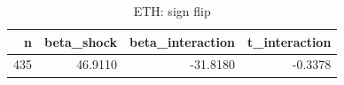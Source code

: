 \begin{table}
\caption{ETH: sign flip}
\label{tab:t7_sign_flip_ETH}
\begin{tabular}{rrrr}
\toprule
n & beta\_shock & beta\_interaction & t\_interaction \\
\midrule
435 & 46.9110 & -31.8180 & -0.3378 \\
\bottomrule
\end{tabular}
\end{table}
